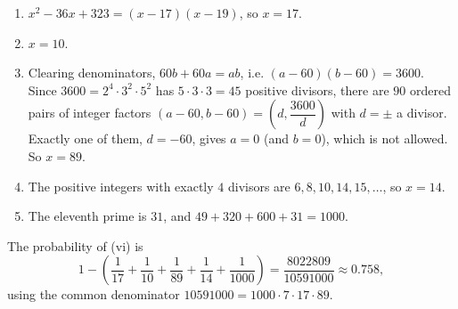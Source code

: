 \begin{enumerate}
\item[(i)] $x^2-36x+323=(x-17)(x-19)$, so $x=17$.
\item[(ii)] $x=10$.
\item[(iii)] Clearing denominators, $60b+60a=ab$, i.e. $(a-60)(b-60)=3600$. Since $3600=2^4\cdot3^2\cdot5^2$ has $5\cdot3\cdot3=45$ positive divisors, there are $90$ ordered pairs of integer factors $(a-60,b-60)=\left(d,\dfrac{3600}{d}\right)$ with $d=\pm$ a divisor. Exactly one of them, $d=-60$, gives $a=0$ (and $b=0$), which is not allowed. So $x=89$.
\item[(iv)] The positive integers with exactly $4$ divisors are $6,8,10,14,15,\dots$, so $x=14$.
\item[(v)] The eleventh prime is $31$, and $49+320+600+31=1000$.
\end{enumerate}
The probability of (vi) is
\[1-\left(\dfrac1{17}+\dfrac1{10}+\dfrac1{89}+\dfrac1{14}+\dfrac1{1000}\right)=\boxed{\dfrac{8022809}{10591000}}\approx0.758,\]
using the common denominator $10591000=1000\cdot7\cdot17\cdot89$.
